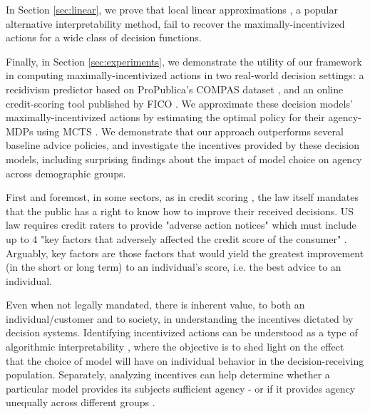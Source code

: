 In Section \ref{sec:linear}, we prove that local linear approximations \cite{lundberg2016unexpected}, a popular alternative interpretability method, fail to recover the maximally-incentivized actions for a wide class of decision functions.

Finally, in Section \ref{sec:experiments}, we demonstrate the utility of our framework in computing maximally-incentivized actions in two real-world decision settings: a recidivism predictor based on ProPublica's COMPAS dataset \cite{angwin_larson_kirchner_mattu_2019}, and an online credit-scoring tool published by FICO \cite{myfico}. 
We approximate these decision models' maximally-incentivized actions by estimating the optimal policy for their agency-MDPs using MCTS \cite{browne2012survey}. %
We demonstrate that our approach outperforms several baseline advice policies, and investigate the incentives provided by these decision models, including surprising findings about the impact of model choice on agency across demographic groups.


First and foremost, in some sectors, as in credit scoring \cite{usc_2016}, the law itself mandates that the public has a right to know how to improve their received decisions. US law requires credit raters to provide "adverse action notices" 
which must include up to $4$ "key factors that adversely affected the credit score of the consumer"
\cite{usc_2016}. Arguably, key factors are those factors that would yield the greatest improvement (in the short or long term) to an individual's score, i.e. the best advice to an individual. 

Even when not legally mandated, there is inherent value, to both an individual/customer and to society, in understanding the incentives dictated by decision systems.
Identifying incentivized actions can be understood as a type of algorithmic interpretability \cite{doshi2017towards, lipton2016mythos}, where the objective is to shed light on the effect that the choice of model will have on individual behavior in the decision-receiving population.
Separately, analyzing incentives can help determine whether a particular model provides its subjects sufficient agency - or if it provides agency unequally across different groups \cite{milli2019social, hu2019disparate}.

